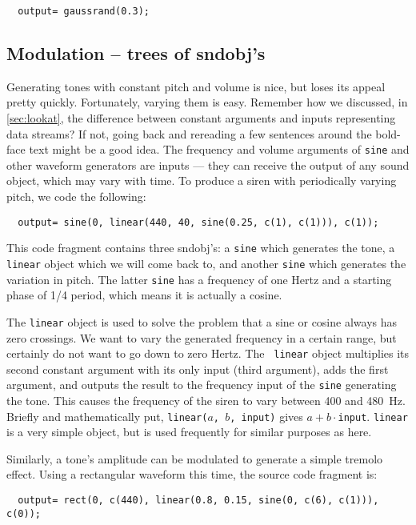\documentclass{article}
\def\bv{\begin{verbatim}}
\begin{document}
\bv
  output= gaussrand(0.3);
\end{verbatim}



\subsection{Modulation -- trees of sndobj's}
\label{sec:modulation}

Generating tones with constant pitch and volume is nice, but loses its appeal
pretty quickly.  Fortunately, varying them is easy.  Remember how we discussed,
in \autoref{sec:lookat}, the difference between constant arguments and inputs
representing data streams?  If not, going back and rereading a few sentences
around the bold-face text might be a good idea.  The frequency and volume
arguments of {\tt sine} and other waveform generators are inputs --- they can
receive the output of any sound object, which may vary with time.  To produce a
siren with periodically varying pitch, we code the following:

\bv
  output= sine(0, linear(440, 40, sine(0.25, c(1), c(1))), c(1));
\end{verbatim}

This code fragment contains three sndobj's: a {\tt sine} which generates the
tone, a {\tt linear} object which we will come back to, and another {\tt sine}
which generates the variation in pitch.  The latter {\tt sine} has a frequency
of one Hertz and a starting phase of 1/4 period, which means it is actually a
cosine.

The {\tt linear} object is used to solve the problem that a sine or cosine
always has zero crossings.  We want to vary the generated frequency in a
certain range, but certainly do not want to go down to zero Hertz.  The {\tt
linear} object multiplies its second constant argument with its only input
(third argument), adds the first argument, and outputs the result to the
frequency input of the {\tt sine} generating the tone.  This causes the
frequency of the siren to vary between 400 and 480~Hz.  Briefly and
mathematically put, {\tt linear($a$, $b$, input)} gives $a+b\cdot{}${\tt input}.
{\tt linear} is a very simple object, but is used frequently for similar
purposes as here.

Similarly, a tone's amplitude can be modulated to generate a simple tremolo
effect.  Using a rectangular waveform this time, the source code fragment is:

\bv
  output= rect(0, c(440), linear(0.8, 0.15, sine(0, c(6), c(1))), c(0));
\end{verbatim}
\end{document}
